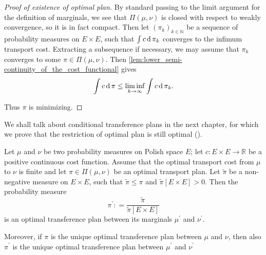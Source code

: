 \begin{proof}[Proof of existence of optimal plan]
	By standard passing to the limit argument for the definition of marginals,
	we see that \( \Pi ( \mu , \nu ) \) is closed with respect to weakly convergence,
	so it is in fact compact.
	Then let \( \left( \pi _ { k } \right) _ { k \in \mathbb{ N } } \) be a sequence of probability measures on \( E \times E \),
	such that \( \int c \operatorname{d} \pi _ { k } \) converges to the infimum transport cost.
	Extracting a subsequence if necessary, we may assume that \( \pi _ { k } \) converges to some \( \pi \in \Pi ( \mu , \nu ) \).
	Then \cref{lem:lower_semi-continuity_of_the_cost_functional} gives
	\[ \int c \operatorname{d} \pi \leq \liminf _ { k \rightarrow \infty } \int c \operatorname{d} \pi _ { k }. \]

	Thus $\pi$ is minimizing.
\end{proof}

We shall talk about conditional transference plans in the next chapter,
for which we prove that the restriction of optimal plan is still optimal (\cite[Theorem 4.6]{villani2008optimal}).

\begin{thm}
	\label{thm:restriction_optimal_plan}
	Let \(  \mu  \) and \(  \nu \) be two probability measures on Polish space $E$;
	let \( c : E \times E \rightarrow \mathbb{ R } \) be a positive continuous cost function.
	Assume that the optimal transport cost from \( \mu \) to \( \nu \) is finite
	and let \( \pi \in \Pi ( \mu , \nu ) \) be an optimal transport plan.
	Let \( \widetilde { \pi } \) be a non-negative measure on \( E \times E \),
	such that \( \widetilde { \pi } \leq \pi \)
	and \( \widetilde { \pi } [ E \times E ] > 0\).
	Then the probability measure
	\[ \pi ^ { \prime } : = \frac { \widetilde { \pi } } { \widetilde { \pi } [ E \times E ] } \]
	is an optimal transference plan between its marginals \( \mu ^ { \prime } \) and \( \nu ^ { \prime } \).

	Moreover, if \( \pi \) is the unique optimal transference plan between \( \mu \)
	and \( \nu \),
	then also \( \pi ^ { \prime } \) is the unique optimal transference plan between \( \mu ^ { \prime } \)
	and \( \nu ^ { \prime } \)
\end{thm}

